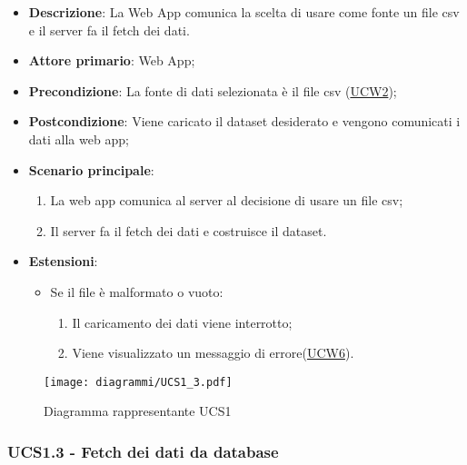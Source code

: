 \begin{itemize}

	\item \textbf{Descrizione}: La Web App comunica la scelta di usare come fonte un file csv e il server fa il fetch dei dati.

	\item \textbf{Attore primario}: Web App;

	\item \textbf{Precondizione}:   La fonte di dati selezionata è il file csv (\hyperref[ssub:ucw2]{UCW2});

	\item \textbf{Postcondizione}:  Viene caricato il dataset desiderato  e vengono comunicati i dati alla web app;

	\item \textbf{Scenario principale}:
	      \begin{enumerate}
		      \item La web app comunica al server al decisione di usare un file csv;
		      \item Il server fa il fetch dei dati e costruisce il dataset.
	      \end{enumerate}

	\item \textbf{Estensioni}:
	      \begin{itemize}

		      \item Se il file è malformato o vuoto:
		            \begin{enumerate}

			            \item Il caricamento dei dati viene interrotto;
			            \item Viene visualizzato un messaggio di errore(\hyperref[sub:ucw6]{UCW6}).

		            \end{enumerate}

	      \end{itemize}

\end{itemize}

\begin{figure}[h]
	\centering
	\texttt{[image: diagrammi/UCS1\_3.pdf]}
	\caption{Diagramma rappresentante UCS1}
	\label{fig:UCS1_3}
\end{figure}

\subsubsection{UCS1.3 - Fetch dei dati da database}
\label{ssub:ucs1.3}

